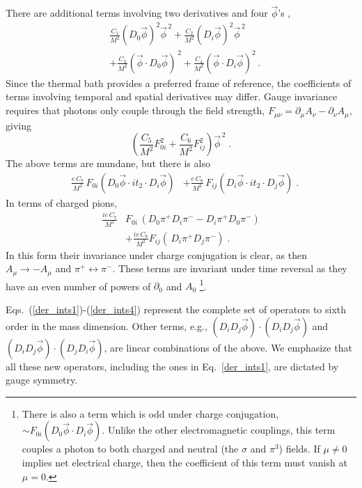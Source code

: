 \documentclass[twocolumn,prd,superscriptaddress, colorlinks, linkcolor=refcol, citecolor=refcol, urlcolor=refcol]{revtex4-2}
\begin{document}
There are additional terms involving two derivatives and 
four $\vec{\phi}$'s \cite{Pisarski:2020dnx},
%
\begin{align}
  & \frac{C_1}{M^2} (D_0 \vec{\phi})^2 \vec{\phi}^{\, 2} + \frac{C_2}{M^2} 
  (D_i \vec{\phi})^2\vec{\phi}^{\, 2}
  \nonumber\\
  &  + \frac{C_3}{M^2} (\vec{\phi} \cdot D_0 \vec{\phi})^{\, 2} 
  + \frac{C_4}{M^2}(\vec{\phi} \cdot D_i\vec{\phi})^2 \, .
  \label{der_ints2}
\end{align}
%
Since the thermal bath provides a preferred frame of reference,
the coefficients of terms involving temporal and spatial derivatives may differ. Gauge invariance requires that  photons  only  couple through the field strength, $F_{\mu \nu} = \partial_\mu A_\nu - \partial_\nu A_\mu$, giving 
%
\begin{equation}
  \left(\frac{C_5}{M^2} F_{0 i}^2 + \frac{C_6}{ M^2} F_{i j}^2 \right)
  \vec{\phi}^{\, 2} \; .
\label{der_ints3}
\end{equation}
%
The above terms are mundane, but there is also
%
\begin{align}
&\frac{ e\, C_7}{M^2}\, F_{0 i} \left( D_0 \vec{\phi} \cdot
i t_2 \cdot D_{i} \vec{\phi}\right) 
&+ \frac{ e\, C_8}{M^2}\, F_{i j} \left( D_i \vec{\phi} \cdot 
i t_2 \cdot
D_j \vec{\phi} \right) \; .
\label{der_ints4}
\end{align}
%
In terms of charged pions,
%
\begin{align}
\frac{i e\, C_7}{M^2} &
F_{0 i}\, \left( D_0 \pi^+ D_i \pi^- - D_i \pi^+ D_0 \pi^-
\right)
\nonumber \\
&+ \frac{i e\, C_8}{M^2} F_{i j} \left(\, D_i \pi^+ D_j \pi^-
\right)\; .
\end{align}
%
In this form their invariance under charge conjugation is clear, 
as then $A_\mu \rightarrow - A_\mu$ and $\pi^+
\leftrightarrow \pi^-$.
These terms are invariant under time reversal as they have an even number of powers of $\partial_0$ and $A_0$
\footnote{
There is also a term which is odd under charge conjugation,
$\sim F_{0 i} (D_0 \vec{\phi} \cdot D_i \vec{\phi})$.
Unlike the other electromagnetic couplings, this
term couples a photon to both charged and neutral  
(the $\sigma$ and $\pi^3$) fields.  If $\mu \neq 0$ implies net electrical charge,
then the coefficient of this term must vanish at $\mu = 0$.
}.

Eqs.~(\ref{der_ints1})-(\ref{der_ints4}) 
represent the complete set of operators to sixth order
in the mass dimension.  Other terms, 
e.g., 
$(D_i D_j \vec{\phi})\cdot (D_i D_j \vec{\phi})$
and $(D_i D_j \vec{\phi})\cdot (D_j D_i \vec{\phi})$,
are linear combinations of the above.
We emphasize that all these new operators, including the ones in Eq.~\eqref{der_ints1}, are dictated by gauge symmetry. 
\end{document}
